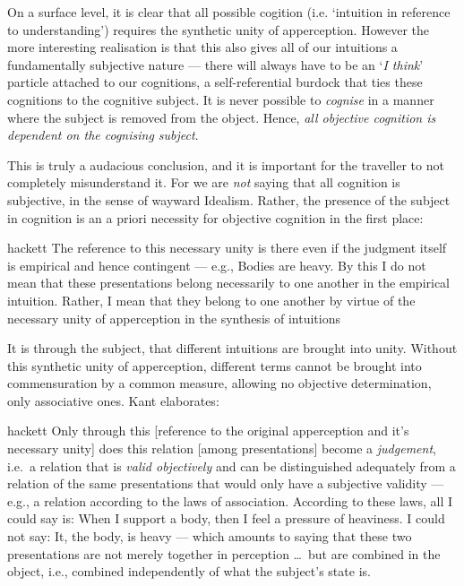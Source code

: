 \noindent
On a surface level, it is clear that all possible cogition (i.e. \enquote*{intuition in reference to understanding}) requires the synthetic unity of apperception. However the more interesting realisation is that this also gives all of our intuitions a fundamentally subjective nature --- there will always have to be an \enquote*{\emph{I think}} particle attached to our cognitions, a self-referential burdock that ties these cognitions to the cognitive subject. It is never possible to \emph{cognise} in a manner where the subject is removed from the object. Hence, \emph{all objective cognition is dependent on the cognising subject}.

This is truly a audacious conclusion, and it is important for the traveller to not completely misunderstand it. For we are \emph{not} saying that all cognition is subjective, in the sense of wayward Idealism. Rather, the presence of the subject in cognition is an a priori necessity for objective cognition in the first place:

\begin{displaycquote}[B142]{hackett}
  The reference to this necessary unity is there even if the judgment itself is empirical and hence contingent --- e.g., Bodies are heavy. By this I do not mean that these presentations belong necessarily to one another in the empirical intuition. Rather, I mean that they belong to one another by virtue of the necessary unity of apperception in the synthesis of intuitions
\end{displaycquote}

\noindent
It is through the subject, that different intuitions are brought into unity. Without this synthetic unity of apperception, different terms cannot be brought into commensuration by a common measure, allowing no objective determination, only associative ones. Kant elaborates:

\begin{displaycquote}[B143]{hackett}
  Only through this [reference to the original apperception and it's necessary unity] does this relation [among presentations] become a \emph{judgement}, i.e.\ a relation that is \emph{valid objectively} and can be distinguished adequately from a relation of the same presentations that would only have a subjective validity --- e.g., a relation according to the laws of association. According to these laws, all I could say is: When I support a body, then I feel a pressure of heaviness. I could not say: It, the body, is heavy --- which amounts to saying that these two presentations are not merely together in perception \ldots\ but are combined in the object, i.e., combined independently of what the subject's state is.
\end{displaycquote}


